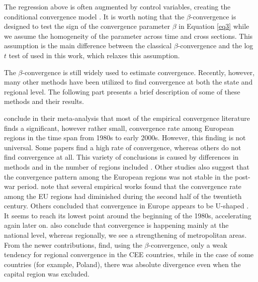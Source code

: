 \documentclass[11pt]{article}
\begin{document}
The regression above is often augmented by control variables, creating the conditional convergence model \citep{sala1996regional}. It is worth noting that the $\beta$-convergence is designed to test the sign of the convergence parameter $\beta$ in Equation \ref{eq3} while we assume the homogeneity of the parameter across time and cross sections. This assumption is the main difference between the classical  $\beta$-convergence and the log $t$ test of \citet{phillips2007transition} used in this work, which relaxes this assumption.

The $\beta$-convergence is still widely used to estimate convergence. Recently, however, many other methods have been utilized to find convergence at both the state and regional level. The following part presents a brief description of some of these methods and their results.
  

\citet{eckey2007convergence} conclude in their meta-analysis that most of the empirical convergence literature finds a significant, however rather small, convergence rate among European regions in the time span from 1980s to early 2000s. However, this finding is not universal. Some papers find a high rate of convergence, whereas others do not find convergence at all. This variety of conclusions is caused by differences in methods and in the number of regions included \citep{eckey2007convergence}. Other studies also suggest that the convergence pattern among the European regions was not stable in the post-war period. \citet{eckey2007convergence} note that several empirical works found that the convergence rate among the EU regions had diminished during the second half of the twentieth century. Others concluded that convergence in Europe appears to be U-shaped \citep{basile2001regional, geppert2008regional}. It seems to reach its lowest point around the beginning of the 1980s, accelerating again later on. \citet{geppert2008regional} also conclude that convergence is happening mainly at the national level, whereas regionally, we see a strengthening of metropolitan areas. From the newer contributions, \citet*{sme2012regional} find, using the $\beta$-convergence, only a weak tendency for regional convergence in the CEE countries, while in the case of some countries (for example, Poland), there was absolute divergence even when the capital region was excluded. %
 
\end{document}
